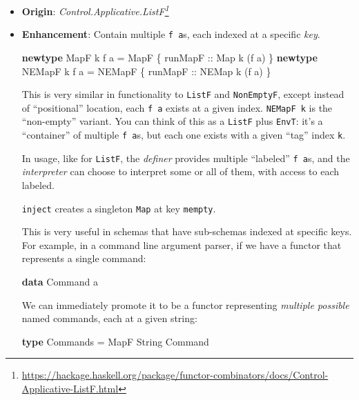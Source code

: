 \documentclass[]{article}
\newenvironment{Shaded}{}{}
\newcommand{\DataTypeTok}[1]{\textcolor[rgb]{0.56,0.13,0.00}{#1}}
\newcommand{\KeywordTok}[1]{\textcolor[rgb]{0.00,0.44,0.13}{\textbf{#1}}}
\newcommand{\NormalTok}[1]{#1}
\newcommand{\OtherTok}[1]{\textcolor[rgb]{0.00,0.44,0.13}{#1}}
\renewcommand{\href}[2]{#2\footnote{\url{#1}}}
\begin{document}
\begin{itemize}
\item
  \textbf{Origin}:
  \emph{\href{https://hackage.haskell.org/package/functor-combinators/docs/Control-Applicative-ListF.html}{Control.Applicative.ListF}}
\item
  \textbf{Enhancement}: Contain multiple \texttt{f\ a}s, each indexed at a
  specific \emph{key}.

\begin{Shaded}
\begin{Highlighting}[]
\KeywordTok{newtype} \DataTypeTok{MapF}\NormalTok{   k f a }\OtherTok{=} \DataTypeTok{MapF}\NormalTok{   \{}\OtherTok{ runMapF ::} \DataTypeTok{Map}\NormalTok{   k (f a) \}}
\KeywordTok{newtype} \DataTypeTok{NEMapF}\NormalTok{ k f a }\OtherTok{=} \DataTypeTok{NEMapF}\NormalTok{ \{}\OtherTok{ runMapF ::} \DataTypeTok{NEMap}\NormalTok{ k (f a) \}}
\end{Highlighting}
\end{Shaded}

  This is very similar in functionality to \texttt{ListF} and
  \texttt{NonEmptyF}, except instead of ``positional'' location, each
  \texttt{f\ a} exists at a given index. \texttt{NEMapF\ k} is the ``non-empty''
  variant. You can think of this as a \texttt{ListF} plus \texttt{EnvT}: it's a
  ``container'' of multiple \texttt{f\ a}s, but each one exists with a given
  ``tag'' index \texttt{k}.

  In usage, like for \texttt{ListF}, the \emph{definer} provides multiple
  ``labeled'' \texttt{f\ a}s, and the \emph{interpreter} can choose to interpret
  some or all of them, with access to each labeled.

  \texttt{inject} creates a singleton \texttt{Map} at key \texttt{mempty}.

  This is very useful in schemas that have sub-schemas indexed at specific keys.
  For example, in a command line argument parser, if we have a functor that
  represents a single command:

\begin{Shaded}
\begin{Highlighting}[]
\KeywordTok{data} \DataTypeTok{Command}\NormalTok{ a}
\end{Highlighting}
\end{Shaded}

  We can immediately promote it to be a functor representing \emph{multiple
  possible} named commands, each at a given string:

\begin{Shaded}
\begin{Highlighting}[]
\KeywordTok{type} \DataTypeTok{Commands} \OtherTok{=} \DataTypeTok{MapF} \DataTypeTok{String} \DataTypeTok{Command}
\end{Highlighting}
\end{Shaded}


\end{itemize}
\end{document}
